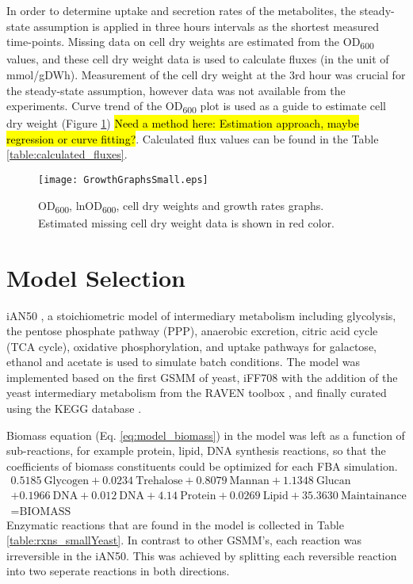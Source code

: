 In order to determine uptake and secretion rates of the metabolites, the steady-state assumption is applied in three hours intervals as the shortest measured time-points. Missing data on cell dry weights are estimated from the OD\textsubscript{600} values, and these cell dry weight data is used to calculate fluxes (in the unit of mmol/gDWh). Measurement of the cell dry weight at the 3rd hour was crucial for the steady-state assumption, however data was not available from the experiments. Curve trend of the OD\textsubscript{600} plot is used as a guide to estimate cell dry weight (Figure \ref{fig:GrowthGraphs}) \hl{Need a method here: Estimation approach, maybe regression or curve fitting?}. Calculated flux values can be found in the Table \ref{table:calculated_fluxes}.
\begin{figure}[H]
  \begin{center}
  \texttt{[image: GrowthGraphsSmall.eps]}
  \end{center}
  \caption[OD\textsubscript{600}, lnOD\textsubscript{600}, cell dry weights and growth rates]{OD\textsubscript{600}, lnOD\textsubscript{600}, cell dry weights and growth rates graphs. Estimated missing cell dry weight data is shown in red color.}
\label{fig:GrowthGraphs}
\end{figure}


\section{Model Selection}
iAN50 \cite{nilsson2016metabolic}, a stoichiometric model of intermediary metabolism including glycolysis, the pentose phosphate pathway (PPP), anaerobic excretion, citric acid cycle (TCA cycle), oxidative phosphorylation, and uptake pathways for galactose, ethanol and acetate is used to simulate batch conditions. The model was implemented based on the first GSMM of yeast, iFF708 \cite{forster2003genome} with the addition of the yeast intermediary metabolism from the RAVEN toolbox \cite{agren2013raven}, and finally curated using the KEGG database \cite{kanehisa2000kegg}.

Biomass equation (Eq. \ref{eq:model_biomass}) in the model was left as a function of sub-reactions, for example protein, lipid, DNA synthesis reactions, so that the coefficients of biomass constituents could be optimized for each FBA simulation.
\begin{multline}
  0.5185\ \textrm{Glycogen} + 0.0234\ \textrm{Trehalose} + 0.8079\ \textrm{Mannan} + 1.1348\ \textrm{Glucan} \\
  + 0.1966\ \textrm{DNA} + 0.012\ \textrm{DNA} +  4.14\ \textrm{Protein} + 0.0269\ \textrm{Lipid} + 35.3630 \ \textrm{Maintainance} \\
  = \textrm{BIOMASS}
   \label{eq:model_biomass}
\end{multline}
Enzymatic reactions that are found in the model is collected in Table \ref{table:rxns_smallYeast}. In contrast to other GSMM's, each reaction was irreversible in the iAN50. This was achieved by splitting each reversible reaction into two seperate reactions in both directions.


